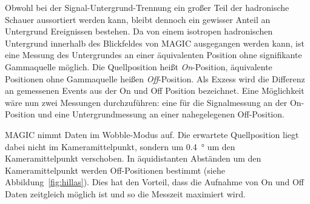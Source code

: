 Obwohl bei der Signal-Untergrund-Trennung ein großer Teil der hadronische Schauer aussortiert werden kann, bleibt
dennoch ein gewisser Anteil an Untergrund Ereignissen bestehen.
Da von einem
isotropen hadronischen Untergrund
innerhalb des Blickfeldes von MAGIC
ausgegangen werden kann,
ist eine Messung des Untergrundes an
einer äquivalenten Position ohne signifikante Gammaquelle möglich.
Die Quellposition heißt \textit{On}-Position, äquivalente Positionen ohne
Gammaquelle heißen \textit{Off}-Position.
Als Exzess wird die Differenz an gemessenen Events aus der On und Off Position
bezeichnet.
Eine Möglichkeit wäre nun zwei Messungen durchzuführen: eine für die
Signalmessung an der On-Position und eine Untergrundmessung an einer
nahegelegenen Off-Position.




MAGIC nimmt Daten im Wobble-Modus auf.
Die erwartete Quellposition liegt dabei nicht im
Kameramittelpunkt,
sondern um
\SI{0.4}{\degree} um den Kameramittelpunkt
verschoben.
In äquidistanten Abständen um den Kameramittelpunkt
werden Off-Positionen bestimmt (siehe Abbildung~\ref{fig:hillas}).
Dies hat den Vorteil, dass die Aufnahme von On und Off Daten zeitgleich möglich
ist und so die Messzeit maximiert wird.


\clearpage

